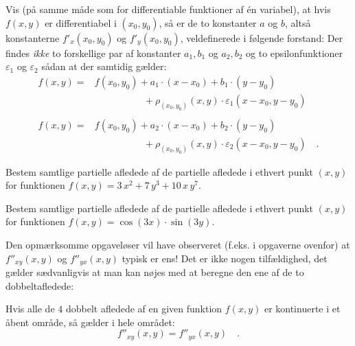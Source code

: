 \begin{exercise}
Vis (på samme måde som for differentiable funktioner af \'{e}n variabel), at hvis $f(x,y)$ er differentiabel i $(x_{0}, y_{0})$, så er de to konstanter $a$ og $b$, altså konstanterne $f'_{x}(x_{0}, y_{0})$ og $f'_{y}(x_{0}, y_{0})$, veldefinerede i følgende forstand: Der findes \emph{ikke} to forskellige par af
konstanter $a_{1}, b_{1}$ og $a_{2}, b_{2}$ og to epsilonfunktioner $\varepsilon_{1}$ og $\varepsilon_{2}$ sådan at der samtidig gælder:
\begin{equation}
\begin{aligned}
f(x,y) = &f(x_{0}, y_{0}) + a_{1}\cdot (x-x_{0}) + b_{1}\cdot (y-y_{0}) \\
&\phantom{f(x,y) =}+ \rho_{(x_{0}, y_{0})}(x,y) \cdot \varepsilon_{1}(x-x_{0},y-y_{0}) \\ \\
f(x,y) = &f(x_{0}, y_{0}) + a_{2}\cdot (x-x_{0}) + b_{2}\cdot (y-y_{0}) \\
&\phantom{f(x,y) =}+ \rho_{(x_{0}, y_{0})}(x,y) \cdot \varepsilon_{2}(x-x_{0},y-y_{0}) \quad .
\end{aligned}
\end{equation}
\end{exercise}



\begin{exercise}
Bestem samtlige partielle afledede af de partielle afledede i ethvert punkt $(x,y)$ for funktionen $f(x,y) = 3\,x^{2} + 7\,y^{3} + 10\,x\,y^{7}$.
\end{exercise}

\begin{exercise}
Bestem samtlige partielle afledede af de partielle afledede i ethvert punkt $(x,y)$ for funktionen $f(x,y) = \cos(3x)\cdot\sin(3y)$.
\end{exercise}


Den opmærksomme opgaveløser vil have observeret (f.eks. i opgaverne ovenfor) at $f''_{xy}(x, y)$ og $f''_{yx}(x, y)$ typisk er ens!
Det er ikke nogen tilfældighed, det gælder sædvanligvis at man kan nøjes med at beregne den ene af de to dobbeltafledede:

\begin{theorem} \label{thmBlandDobbelt}
Hvis alle de $4$ dobbelt afledede af en given funktion $f(x,y)$ er kontinuerte i et åbent område, så gælder i hele området:
\begin{equation}
f''_{xy}(x,y) = f''_{yx}(x,y) \quad .
\end{equation}
\end{theorem}

